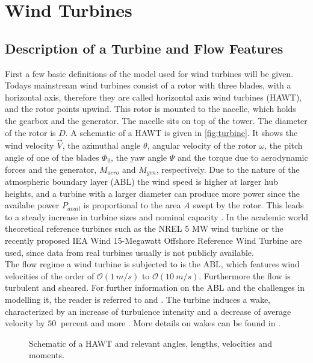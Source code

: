 \section{Wind Turbines}
\subsection{Description of a Turbine and Flow Features}
First a few basic definitions of the model used for wind turbines will be given. Todays mainstream wind turbines consist of a rotor with three blades, with a horizontal axis, therefore they are called horizontal axis wind turbines (HAWT), and the rotor points upwind.  This rotor is mounted to the nacelle, which holds the gearbox and the generator. The nacelle sits on top of the tower. The diameter of the rotor is $D$. A schematic of a HAWT is given in \autoref{fig:turbine}. It shows the wind velocity $\vec{V}$, the azimuthal angle $\theta$, angular velocity of the rotor $\omega$, the pitch angle of one of the blades $\Phi_0$, the yaw angle $\Psi$ and the torque due to aerodynamic forces and the generator, $M_{aero}$ and $M_{gen}$, respectively. Due to the nature of the atmospheric boundary layer (ABL) the wind speed is higher at larger hub heights, and a turbine with a larger diameter can produce more power since the availabe power $P_{avail}$ is proportional to the area $A$ swept by the rotor. This leads to a steady increase in turbine sizes and nominal capacity \cite{rohrig_powering_2019}. In the academic world theoretical reference turbines such as the NREL 5 MW wind turbine \cite{jonkman_definition_2009} or the recently proposed IEA Wind 15-Megawatt Offshore Reference Wind Turbine \cite{gaertner_iea_2020} are used, since data from real turbines usually is not publicly available.\cite{hansen_aerodynamics_2008} \\
The flow regime a wind turbine is subjected to is the ABL, which features wind velocities of the order of $\mathcal{O}(\SI{1}{m/s})$ to $\mathcal{O}(\SI{10}{m/s})$. Furthermore the flow is turbulent and sheared. For further information on the ABL and the challenges in modelling it, the reader is referred to \cite{kaimal_atmospheric_1994} and \cite{holtslag_stable_2013}. The turbine induces a wake, characterized by an increase of turbulence intensity and a decrease of average velocity by $\SI{50}{}$ percent and more \cite{abkar_wake_2016}. More details on wakes can be found in \cite{boersma_tutorial_2017}.
\begin{figure}[h]
	\centering
	\def\svgwidth{0.5 \textwidth}
	
	\caption{Schematic of a HAWT and relevant angles, lengths, velocities and moments.}
	\label{fig:turbine}
\end{figure}
